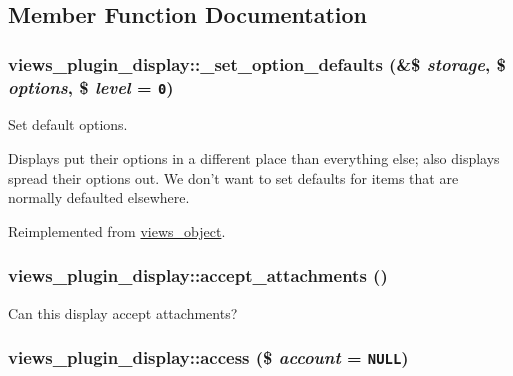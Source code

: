 \subsection{Member Function Documentation}
\hypertarget{classviews__plugin__display_788afea5209b04183d46460349e8a2a4}{
\subsubsection[{\_\-set\_\-option\_\-defaults}]{\setlength{\rightskip}{0pt plus 5cm}views\_\-plugin\_\-display::\_\-set\_\-option\_\-defaults (\&\$ {\em storage}, \/  \$ {\em options}, \/  \$ {\em level} = {\tt 0})}}
\label{classviews__plugin__display_788afea5209b04183d46460349e8a2a4}


Set default options.

Displays put their options in a different place than everything else; also displays spread their options out. We don't want to set defaults for items that are normally defaulted elsewhere. 

Reimplemented from \hyperlink{classviews__object}{views\_\-object}.\hypertarget{classviews__plugin__display_f94245cf0dde1c883d9b3dc3760dbc9c}{
\subsubsection[{accept\_\-attachments}]{\setlength{\rightskip}{0pt plus 5cm}views\_\-plugin\_\-display::accept\_\-attachments ()}}
\label{classviews__plugin__display_f94245cf0dde1c883d9b3dc3760dbc9c}


Can this display accept attachments? \hypertarget{classviews__plugin__display_122d9a961584bfb6f0c4c78715c543e5}{
\subsubsection[{access}]{\setlength{\rightskip}{0pt plus 5cm}views\_\-plugin\_\-display::access (\$ {\em account} = {\tt NULL})}}
\label{classviews__plugin__display_122d9a961584bfb6f0c4c78715c543e5}


